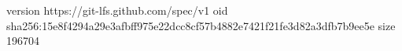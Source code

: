 version https://git-lfs.github.com/spec/v1
oid sha256:15e8f4294a29e3afbff975e22dcc8cf57b4882e7421f21fe3d82a3dfb7b9ee5e
size 196704
